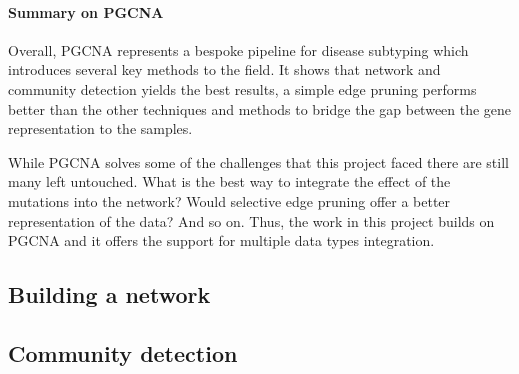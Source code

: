 \paragraph{Summary on PGCNA}

Overall, PGCNA represents a bespoke pipeline for disease subtyping which introduces several key methods to the field. It shows that network and community detection yields the best results, a simple edge pruning performs better than the other techniques and methods to bridge the gap between the gene representation to the samples.

While PGCNA solves some of the challenges that this project faced there are still many left untouched. What is the best way to integrate the effect of the mutations into the network? Would selective edge pruning offer a better representation of the data? And so on. Thus, the work in this project builds on PGCNA and it offers the support for multiple data types integration.

\subsection{Building a network}

\subsection{Community detection}


